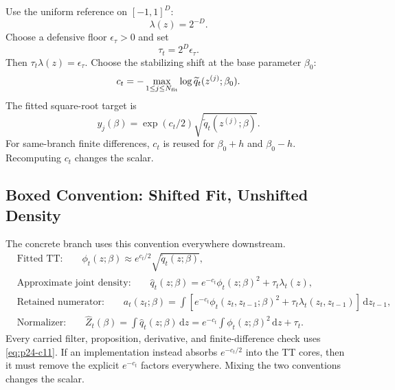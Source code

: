 \documentclass[11pt]{article}
\numberwithin{equation}{section}
\newcommand{\dd}{\,\mathrm d}
\begin{document}
Use the uniform reference on \([-1,1]^D\):
\begin{equation}
    \lambda(z)=2^{-D}.
    \label{eq:p24-c7}
\end{equation}
Choose a defensive floor \(\epsilon_\tau>0\) and set
\begin{equation}
    \tau_t=2^D\epsilon_\tau.
    \label{eq:p24-c8}
\end{equation}
Then \(\tau_t\lambda(z)=\epsilon_\tau\).  Choose the stabilizing shift at the
base parameter \(\beta_0\):
\begin{equation}
    c_t=-\max_{1\le j\le N_{\rm fit}}
    \log \widetilde q_t(z^{(j)};\beta_0).
    \label{eq:p24-c9}
\end{equation}
The fitted square-root target is
\begin{equation}
    y_j(\beta)=\exp(c_t/2)\sqrt{\widetilde q_t(z^{(j)};\beta)}.
    \label{eq:p24-c10}
\end{equation}
For same-branch finite differences, \(c_t\) is reused for
\(\beta_0+h\) and \(\beta_0-h\).  Recomputing \(c_t\) changes the scalar.

\subsection{Boxed Convention: Shifted Fit, Unshifted Density}

The concrete branch uses this convention everywhere downstream.
\begin{equation}
\boxed{
\begin{aligned}
&\text{Fitted TT:}\qquad
  \phi_t(z;\beta)\approx e^{c_t/2}\sqrt{\widetilde q_t(z;\beta)},\\
&\text{Approximate joint density:}\qquad
  \widehat q_t(z;\beta)
  =
  e^{-c_t}\phi_t(z;\beta)^2+\tau_t\lambda_t(z),\\
&\text{Retained numerator:}\qquad
  a_t(z_t;\beta)
  =
  \int
  \left[e^{-c_t}\phi_t(z_t,z_{t-1};\beta)^2
        +\tau_t\lambda_t(z_t,z_{t-1})\right]\dd z_{t-1},\\
&\text{Normalizer:}\qquad
  \widehat Z_t(\beta)
  =
  \int \widehat q_t(z;\beta)\dd z
  =
  e^{-c_t}\int\phi_t(z;\beta)^2\dd z+\tau_t.
\end{aligned}}
\label{eq:p24-c11}
\end{equation}
Every carried filter, proposition, derivative, and finite-difference check uses
\eqref{eq:p24-c11}.  If an implementation instead absorbs \(e^{-c_t/2}\) into the TT cores,
then it must remove the explicit \(e^{-c_t}\) factors everywhere.  Mixing the
two conventions changes the scalar.
\end{document}
